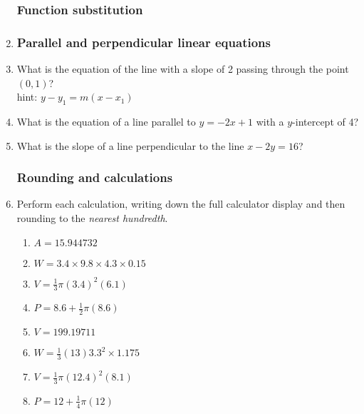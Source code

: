 \begin{enumerate}
\subsubsection*{Function substitution}
\item 
\begin{enumerate}[itemsep=2cm]
    \end{enumerate}


\newpage
\subsubsection*{Parallel and perpendicular linear equations}

  \item What is the equation of the line with a slope of 2 passing through the point $(0,1)$? \\
  hint: $y-y_1=m(x-x_1)$ \vspace{1.5cm}
  \item What is the equation of a line parallel to $y=-2x+1$ with a $y$-intercept of 4? \vspace{1.5cm}
  \item What is the slope of a line perpendicular to the line $x-2y=16$? \vspace{3cm}

\subsubsection*{Rounding and calculations}
  \item Perform each calculation, writing down the full calculator display and then rounding to the \emph{nearest hundredth}.
    \begin{multicols}{2}
    \begin{enumerate}[itemsep=2cm]
      \item $A=15.944732$
      \item $W=3.4 \times 9.8 \times 4.3 \times 0.15$
            
      \item $V=\frac{1}{3} \pi (3.4)^2(6.1)$
      \item $P=8.6 + \frac{1}{2} \pi (8.6)$  
      \item $V=199.19711$
      \item $W=\frac{1}{3} (13)  3.3^2 \times 1.175$
      \item $V=\frac{1}{3} \pi (12.4)^2(8.1)$
      \item $P=12 + \frac{1}{4} \pi (12)$ 
    \end{enumerate}
    \end{multicols}\vspace{2cm}
  

\end{enumerate}
